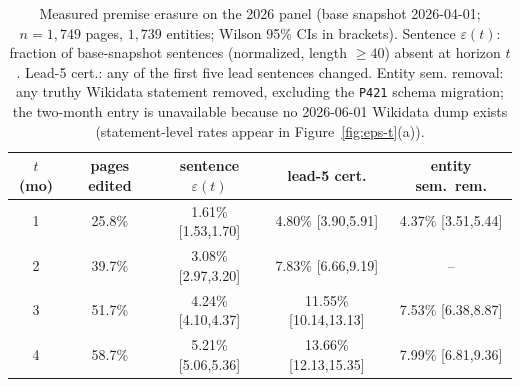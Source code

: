 \begin{table}[t]
\footnotesize
\caption{Measured premise erasure on the 2026 panel (base snapshot
2026-04-01; $n=1{,}749$ pages, $1{,}739$ entities; Wilson 95\% CIs in
brackets).  Sentence $\varepsilon(t)$: fraction of base-snapshot
sentences (normalized, length $\ge 40$) absent at horizon $t$.  Lead-5
cert.: any of the first five lead sentences changed.  Entity sem.
removal: any truthy Wikidata statement removed, excluding the
\texttt{P421} schema migration; the two-month entry is unavailable
because no 2026-06-01 Wikidata dump exists (statement-level rates appear
in Figure~\ref{fig:eps-t}(a)).}
\label{tab:eps-t}
\tabcolsep 3pt
\begin{tabular*}{\columnwidth}{@{\extracolsep{\fill}}ccccc@{}}
\toprule
$t$ (mo) & pages edited & sentence $\varepsilon(t)$ & lead-5 cert. & entity sem.\ rem. \\\hline
1 & 25.8\% & 1.61\% [1.53,1.70] & 4.80\% [3.90,5.91] & 4.37\% [3.51,5.44] \\
2 & 39.7\% & 3.08\% [2.97,3.20] & 7.83\% [6.66,9.19] & -- \\
3 & 51.7\% & 4.24\% [4.10,4.37] & 11.55\% [10.14,13.13] & 7.53\% [6.38,8.87] \\
4 & 58.7\% & 5.21\% [5.06,5.36] & 13.66\% [12.13,15.35] & 7.99\% [6.81,9.36] \\
\bottomrule
\end{tabular*}
\end{table}